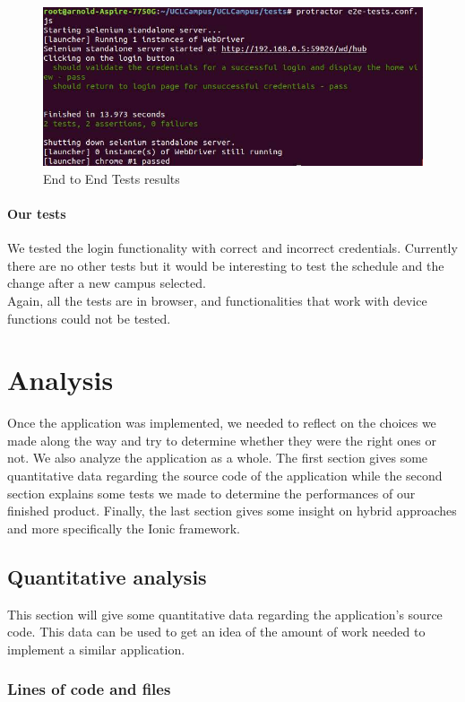 \documentclass{eplmastersthesis}
\begin{document}
\begin{figure}[H]
\centering
\includegraphics[scale = 0.7]{Images/test2.png}
\caption{End to End Tests results}
\end{figure}


\subsubsection{Our tests}
We tested the login functionality with correct and incorrect credentials.
Currently there are no other tests but it would be interesting to test the schedule and the change after a new campus selected.\\
Again, all the tests are in browser, and functionalities that work with device functions could not be tested. 
\chapter{Analysis}

Once the application was implemented, we needed to reflect on the choices we made along the way and try to determine whether they were the right ones or not. We also analyze the application as a whole. The first section gives some quantitative data regarding the source code of the application while the second section explains some tests we made to determine the performances of our finished product. Finally, the last section gives some insight on hybrid approaches and more specifically the Ionic framework.

\section{Quantitative analysis}

This section will give some quantitative data regarding the application's source code. This data can be used to get an idea of the amount of work needed to implement a similar application.

\subsection{Lines of code and files}
\end{document}
